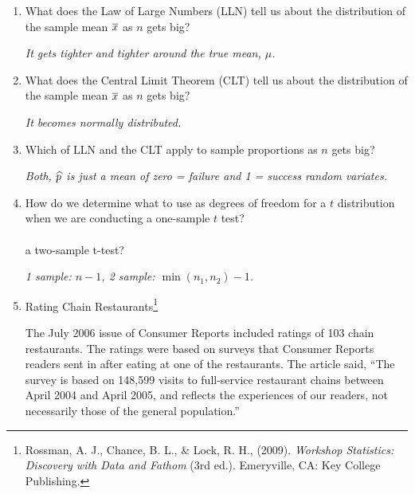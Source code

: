 \begin{enumerate}
  \item What does the Law of Large Numbers (LLN) tell us about the
    distribution of the sample mean $\overline{x}$ as $n$ gets big?\\
\begin{key}
 {\it  It gets tighter and tighter around the true mean, $\mu$.}      
\end{key}
  \item What does the Central Limit Theorem (CLT) tell us about the
    distribution of the sample mean $\overline{x}$ as $n$ gets big?\\

\begin{key}
 {\it  It becomes normally distributed.  }      
\end{key}
   \item Which of  LLN and the CLT apply to sample
    proportions as $n$ gets big? \\
\begin{key}
 {\it Both, $\widehat{p}$ is just a mean of zero = failure and 1 = success
   random variates. }      
\end{key}
   \item How do we determine what to use as degrees of freedom for a
    $t$ distribution when we are conducting a one-sample $t$ test?\\
    \\ a two-sample t-test?\\

\begin{key}
 {\it 1 sample: $n-1$, 2 sample: $\min(n_1, n_2) -1$. }      
\end{key}
   \item Rating Chain Restaurants\footnote{ Rossman, A. J., Chance,
      B. L., \& Lock, R. H., (2009). {\it Workshop Statistics:
        Discovery with Data and Fathom}  (3rd ed.). Emeryville, CA:
      Key College Publishing. } 

    The July 2006 issue of Consumer Reports included ratings of 103
    chain restaurants. The ratings were based on surveys that Consumer
    Reports readers sent in after eating at one of the
    restaurants. The article said, ``The survey is based on 148,599
    visits to full-service restaurant chains between April 2004 and
    April 2005, and reflects the experiences of our readers, not
    necessarily those of the general population.''


\end{enumerate}
